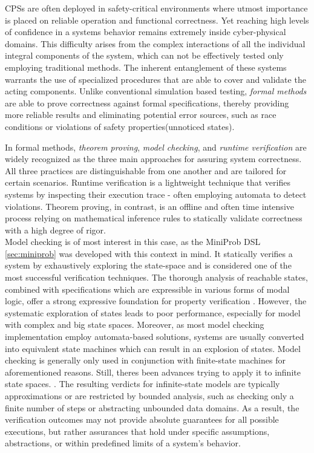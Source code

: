 CPSs are often deployed in safety-critical environments where utmost importance is placed on reliable operation and functional correctness. Yet reaching high levels of confidence
in a systems behavior remains extremely inside cyber-physical domains.\cite{formalMethodsCPSCritical} This difficulty arises from the complex interactions of all the individual integral
components of the system, which can not be effectively tested only employing traditional methods. The inherent entanglement of these systems warrants the use of
specialized procedures that are able to cover and validate the acting components. Unlike conventional simulation based testing, \textit{formal methods} are able to prove correctness against
formal specifications, thereby providing more reliable results and eliminating potential error sources, such as race conditions or violations of safety properties(unnoticed states).

In formal methods, \textit{theorem proving}, \textit{model checking}, and \textit{runtime verification} are widely recognized as the three main approaches for assuring
system correctness\cite{formalMethodsBig3,formalMethodsCPSCritical}.
All three practices are distinguishable from one another and are tailored for certain scenarios. Runtime verification is a lightweight technique that verifies systems
by inspecting their execution trace - often employing automata to detect violations. Theorem proving, in contrast, is an offline and often time intensive
process relying on mathematical inference rules to statically validate correctness with a high degree of rigor.\\

Model checking is of most interest in this case, as the MiniProb DSL \ref{sec:miniprob} was developed with this context in mind. \cite{POPACheck}
It statically verifies a system by exhaustively exploring the state-space and is considered one of the most successful verification techniques. \cite{formalMethodsCPSCritical}
The thorough analysis of reachable states, combined with specifications which are expressible in various forms of modal logic,
offer a strong expressive foundation for property verification \cite{modelCheckingPrinceples}. However, the systematic exploration of states leads to poor performance, especially for model with
complex and big state spaces. Moreover, as most model checking implementation employ automata-based solutions, systems are usually converted into
equivalent state machines which can result in an explosion of states.\cite{}
Model checking is generally only used in conjunction with finite-state machines for aforementioned reasons. Still, theres been advances trying to apply it to infinite state spaces.
\cite{modelCheckingInfCounter,modelCheckingInfSymb}. The resulting verdicts for infinite-state models are typically approximations or are restricted by bounded analysis,
such as checking only a finite number of steps or abstracting unbounded data domains. As a result, the verification outcomes may not provide absolute guarantees for all
possible executions, but rather assurances that hold under specific assumptions, abstractions, or within predefined limits of a system's behavior.

